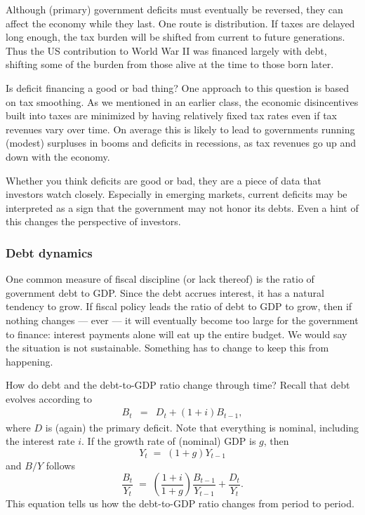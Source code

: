 \documentclass[letterpaper,12pt]{article}
\begin{document}


Although (primary) government deficits must eventually be reversed, 
they can affect the economy while they last.  
One route is distribution.  
If taxes are delayed long enough, the tax burden 
will be shifted from current to future generations.
Thus the US contribution to World War II was financed largely with debt, 
shifting some of the burden from those alive at the time to those born later.


Is deficit financing a good or bad thing?  
One approach to this question is based on tax smoothing.
As we mentioned in an earlier class,
the economic disincentives built into taxes are minimized
by having relatively fixed tax rates even if tax revenues
vary over time.
On average this is likely to lead to governments running (modest) 
surpluses in booms and deficits in recessions, 
as tax revenues go up and down with the economy.  

Whether you think deficits are good or bad, 
they are a piece of data that investors watch closely.
Especially in emerging markets, current deficits
may be interpreted as a sign that the government 
may not honor its debts.
Even a hint of this changes the perspective of investors.  


\subsubsection*{Debt dynamics} 

One common measure of fiscal discipline (or lack thereof)
is the ratio of government debt to GDP.  
Since the debt accrues interest, it has a natural tendency to grow.  
If fiscal policy leads the ratio of debt to GDP to grow, 
then if nothing changes --- ever --- it will eventually become too large 
for the government to finance:  
interest payments alone will eat up the entire budget.  
We would say the situation is not sustainable.  
Something has to change to keep this from happening.  


How do debt and the debt-to-GDP ratio change through time?  
Recall that debt evolves according to  
\begin{eqnarray*}
    B_{t} &=& D_t + (1+i) B_{t-1}  ,
\end{eqnarray*}
where $D$ is (again) the primary deficit.  
Note that everything is nominal, including the interest rate $i$.  
If the growth rate of (nominal) GDP is $g$, then  
\[
    Y_{t} \;=\; (1+g) Y_{t-1} 
\]
and $B/Y$ follows 
\begin{equation}
    \frac{B_{t}}{Y_{t}} \;=\; 
                \left( \frac{1+i}{1+g} \right)  \frac{B_{t-1}}{Y_{t-1}} 
             +    \frac{D_{t}}{Y_{t}} .
    \label{eq:debtdynamics}             
\end{equation}
This equation tells us how the debt-to-GDP ratio changes 
from period to period.   
\end{document}
